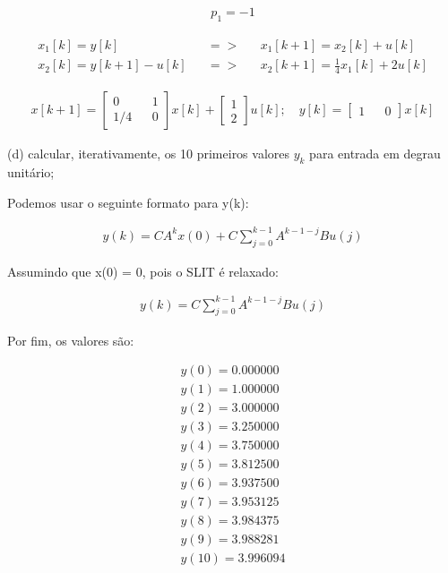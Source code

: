 \documentclass[10pt]{article}
\begin{document}
\begin{align*}
    p_1 = - 1
\end{align*}

\begin{align*}
    x_1[k] = y[k]&& => && x_1[k+1] = x_2[k] + u[k] \\
    x_2[k] = y[k+1] - u[k] && => && x_2[k+1] = \frac{1}{4} x_1[k] + 2u[k]
\end{align*}

\begin{align*}
    x[k+1]
    =
    \begin{bmatrix}
        0 && 1 \\
        1/4 && 0
    \end{bmatrix}
    x[k]
    +
    \begin{bmatrix}
        1\\
        2
    \end{bmatrix}
    u[k];
    \quad
    y[k] =
    \begin{bmatrix}
        1 && 0
    \end{bmatrix}
    x[k]
\end{align*}

(d) calcular, iterativamente, os 10 primeiros valores $y_k$ para entrada em degrau unitário;

Podemos usar o seguinte formato para y(k):

\begin{align*}
    y(k) = CA^{k}x(0) + C \sum\limits_{j=0}^{k-1} A^{k-1-j}Bu(j)
\end{align*}

Assumindo que x(0) = 0, pois o SLIT é relaxado:

\begin{align*}
    y(k) = C \sum\limits_{j=0}^{k-1} A^{k-1-j}Bu(j)
\end{align*}

Por fim, os valores são:

\begin{align*}
    y(0) = 0.000000\\
    y(1) = 1.000000\\
    y(2) = 3.000000\\
    y(3) = 3.250000\\
    y(4) = 3.750000\\
    y(5) = 3.812500\\
    y(6) = 3.937500\\
    y(7) = 3.953125\\
    y(8) = 3.984375\\
    y(9) = 3.988281\\
    y(10)= 3.996094
\end{align*}
\end{document}

